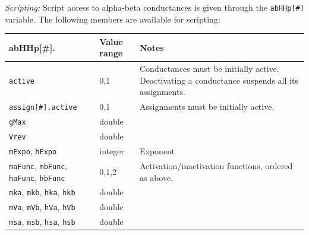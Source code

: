 \documentclass{article}
\begin{document}
\noindent
\emph{Scripting:} Script access to alpha-beta conductances is given through the \texttt{abHHp[\#]} variable.
The following members are available for scripting: \\
\begin{tabularx}{\linewidth}{|ll|X|}
	\hline
	{\bf abHHp[\#].\textvisiblespace} & {\bf Value range} & {\bf Notes} \\
	\hline
	\texttt{active} & 0,1 & Conductances must be initially active. Deactivating a conductance suspends all
	its assignments. \\
	\texttt{assign[\#].active} & 0,1 & Assignments must be initially active. \\
	\texttt{gMax} & double & \\
	\texttt{Vrev} & double & \\
	\texttt{mExpo}, \texttt{hExpo} & integer & Exponent \\
	\texttt{maFunc}, \texttt{mbFunc}, \texttt{haFunc}, \texttt{hbFunc} & 0,1,2 & Activation/inactivation 
	functions, ordered as above. \\
	\texttt{mka}, \texttt{mkb}, \texttt{hka}, \texttt{hkb} & double & \\
	\texttt{mVa}, \texttt{mVb}, \texttt{hVa}, \texttt{hVb} & double & \\
	\texttt{msa}, \texttt{msb}, \texttt{hsa}, \texttt{hsb} & double & \\
	\hline
\end{tabularx}
\end{document}
